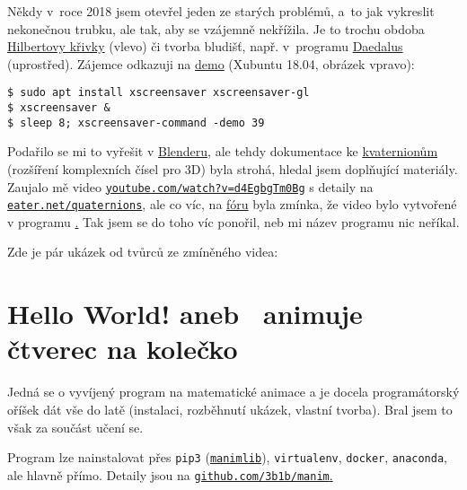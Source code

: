 Někdy v~roce 2018 jsem otevřel jeden ze starých problémů, a~to jak vykreslit nekonečnou trubku, ale tak, aby se vzájemně nekřížila. Je to trochu obdoba \href{https://cs.wikipedia.org/wiki/Hilbertova_k\%C5\%99ivka}{Hilbertovy křivky} (vlevo) či tvorba bludišť, např. v~programu \href{http://www.astrolog.org/labyrnth/daedalus.htm}{Daedalus} (uprostřed). Zájemce odkazuji na \href{https://www.jwz.org/xscreensaver/}{demo} (Xubuntu 18.04, obrázek vpravo): 

\begin{lstlisting}
$ sudo apt install xscreensaver xscreensaver-gl
$ xscreensaver &
$ sleep 8; xscreensaver-command -demo 39
\end{lstlisting}

\maldelka=30mm
\noindent
{}\hfill
{}\hfill
{}%

Podařilo se mi to vyřešit v 
\href{https://www.blender.org/}{Blenderu,} ale tehdy dokumentace ke 
\href{https://cs.wikipedia.org/wiki/Kvaternion}{kvaternionům} (rozšíření komplexních čísel pro 3D) byla strohá, hledal jsem doplňující materiály. Zaujalo mě video 
\href{https://youtube.com/watch?v=d4EgbgTm0Bg}{\tt youtube.com/watch?v=d4EgbgTm0Bg} s detaily na \href{https://eater.net/quaternions}{\tt eater.net/quaternions}, ale co víc, na 
\href{https://eater.net/quaternions#comment-4164465515}{fóru} byla zmínka, že video bylo vytvořené v programu 
\href{https://github.com/3b1b/manim}{\Manim.} Tak jsem se do toho víc ponořil, neb mi název programu nic neříkal.

Zde je pár ukázek od tvůrců ze zmíněného videa:
\smallskip

\noindent
{}\hfill
{}%




\section{Hello World! aneb \Manim\ animuje čtverec na kolečko}

Jedná se o vyvíjený program na matematické animace a je docela programátorský oříšek dát vše do latě (instalaci, rozběhnutí ukázek, vlastní tvorba). Bral jsem to však za součást učení se.

Program lze nainstalovat přes \texttt{pip3} (\href{https://pypi.org/project/manimlib/}{\tt manimlib}), \texttt{virtualenv}, \texttt{docker}, \texttt{anaconda}, ale hlavně přímo. Detaily jsou na \href{https://github.com/3b1b/manim}{\texttt{github.com/3b1b/manim}.}

